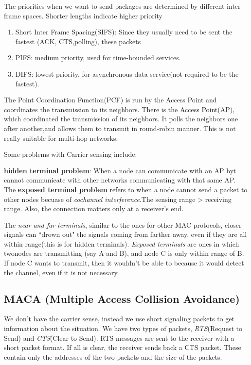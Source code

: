 \documentclass{article}
\begin{document}
The priorities when we want to send packages are determined by different inter frame spaces. Shorter lengths 
indicate higher priority
\begin{enumerate}
	\item{Short Inter Frame Spacing(SIFS)}:  Since they usually need to be sent the fastest (ACK, CTS,polling), these
	packets 
	\item{PIFS}: medium priority, used for time-bounded services.
	\item{DIFS}: lowest priority, for asynchronous data service(not required to be the fastest).
\end{enumerate}
The Point Coordination Function(PCF) is run by the Access Point and coordinates the transmission to its neighbors. There is
the Access Point(AP), which coordinated the transmission of its neighbors. It polls the neighbors one after another,and 
allows them to transmit in round-robin manner. This is not really suitable for multi-hop networks.

Some problems with Carrier sensing include:

\textbf{hidden terminal problem}: When a node can communicate with an AP byt cannot communicate with other networks
communicating with that same AP. The \textbf{exposed terminal problem} refers to when a node cannot send a packet 
to other nodes becuase of \textit{cochannel interference}.The sensing range > receiving range. Also, the 
connection matters only at a receiver's end.

The \textit{near and far terminals}, similar to the ones for other MAC protocols, closer signals can ``drown out" the
signals coming from farther away, even if they are all within range(this is for hidden terminals). 
\textit{Exposed terminals} are ones in which twonodes are transmitting (say A and B), and node C is 
only within range of B. If node C wants to transmit, then it wouldn't
be able to because it would detect the channel, even if it is not necessary. 

\subsection{MACA (Multiple Access Collision Avoidance)}
We don't have the carrier sense, instead we use short signaling packets to get information about the situation. We have 
two types of packets, \textit{RTS}(Request to Send) and \textit{CTS}(Clear to Send). RTS messages are sent to the receiver
with a short packet format. If all is clear, the receiver sends back a CTS packet. These contain only the addresses of the 
two packets and the size of the packets.
\end{document}
